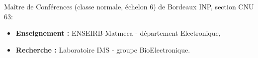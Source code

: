 

\begin{cvparagraph}

Maître de Conférences (classe normale, échelon 6) de Bordeaux INP, section CNU 63:
\begin{itemize}
	\item \textbf{Enseignement :} ENSEIRB-Matmeca - département Electronique,
	\item \textbf{Recherche :} Laboratoire IMS - groupe BioElectronique.
\end{itemize}
\end{cvparagraph}